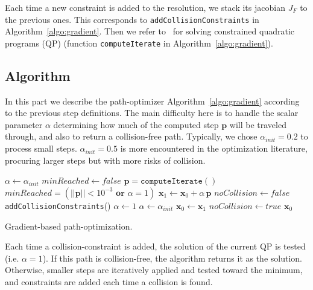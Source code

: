 \documentclass{tADR2e}
\newcommand\p{\mathbf{p}}
\newcommand\xx{\mathbf{x}}
\begin{document}
\vspace{0.2cm}

Each time a new constraint is added to the resolution, we stack its jacobian $J_F$ to the previous ones. This corresponds to \texttt{addCollisionConstraints} in 
Algorithm~\ref{algo:gradient}. Then we refer to~\cite{nocedal2006numerical} for solving constrained quadratic programs (QP) (function \texttt{computeIterate} in 
Algorithm~\ref{algo:gradient}).


\subsection{Algorithm}

In this part we describe the path-optimizer Algorithm~\ref{algo:gradient} 
according to the previous step definitions. The main difficulty here is to handle 
the scalar parameter $\alpha$ determining how much of the computed step $\p$ will 
be traveled through, and also to return a collision-free path. Typically, we 
chose $\alpha_{init} = 0.2$ to process small steps. $\alpha_{init} = 0.5$ is more 
encountered in the optimization literature, procuring larger steps but with more 
risks of collision.

\begin{algorithm}
\begin{algorithmic}%
\Procedure{Optimize}{$\xx_0$}
	\State $\alpha \gets \alpha_{init}$
	\State $minReached \gets false$
		\State $\p = \texttt{computeIterate}()$
		\State $minReached = (||\p||<10^{-3} \textbf{ or } \alpha=1)$
		\State $\xx_1 \gets \xx_0 + \alpha\,\p$
		\If{(\textbf{not}(\texttt{validatePath($\xx_1$)}))}
			\State $noCollision \gets false$
				\State \texttt{addCollisionConstraints}()
				\State $\alpha \gets 1$
			\Else
				\State $\alpha \gets \alpha_{init}$
			\EndIf
		\Else
			\State $\xx_0 \gets \xx_1$
			\State $noCollision \gets true$
		\EndIf
	\EndWhile
	\Return $\xx_0$
\EndProcedure
\end{algorithmic}
\caption{Gradient-based path-optimization.} \label{algo:gradient}
\end{algorithm}

Each time a collision-constraint is added, 
the solution of the current QP is tested (i.e. $\alpha = 1$). If this path is collision-free, the algorithm returns it as the solution. Otherwise, 
smaller steps are iteratively applied and tested toward the minimum, and constraints are added each time a collision is found.
\end{document}
